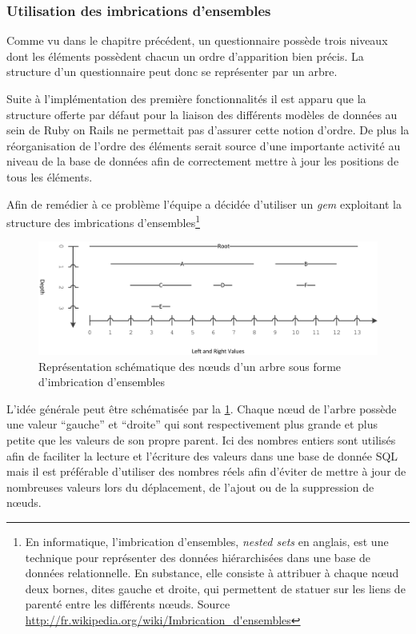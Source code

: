 \documentclass[12pt,a4paper]{book}
\begin{document}
\subsubsection{Utilisation des imbrications d'ensembles}
\label{sec.aws}

Comme vu dans le chapitre précédent, un questionnaire possède trois niveaux dont les éléments possèdent chacun un ordre d'apparition bien précis. La structure d'un questionnaire peut donc se représenter par un arbre.

Suite à l'implémentation des première fonctionnalités il est apparu que la structure offerte par défaut pour la liaison des différents modèles de données au sein de Ruby on Rails ne permettait pas d'assurer cette notion d'ordre. De plus la réorganisation de l'ordre des éléments serait source d'une importante activité au niveau de la base de données afin de correctement mettre à jour les positions de tous les éléments.

Afin de remédier à ce problème l'équipe a décidée d'utiliser un \textit{gem} exploitant la structure des imbrications d'ensembles\footnote{En informatique, l'imbrication d'ensembles, \textit{nested sets} en anglais, est une technique pour représenter des données hiérarchisées dans une base de données relationnelle. En substance, elle consiste à attribuer à chaque nœud deux bornes, dites gauche et droite, qui permettent de statuer sur les liens de parenté entre les différents nœuds. Source \url{http://fr.wikipedia.org/wiki/Imbrication_d'ensembles}}

\begin{figure}[htp]
\centering
\includegraphics[scale=.12]{img/nested1.png}
\caption{Représentation schématique des nœuds d'un arbre sous forme d'imbrication d'ensembles}
\label{img:nested1}
\end{figure}

L'idée générale peut être schématisée par la \cref{img:nested1}. Chaque nœud de l'arbre possède une valeur ``gauche'' et ``droite'' qui sont respectivement plus grande et plus petite que les valeurs de son propre parent. Ici des nombres entiers sont utilisés afin de faciliter la lecture et l'écriture des valeurs dans une base de donnée SQL mais il est préférable d'utiliser des nombres réels afin d'éviter de mettre à jour de nombreuses valeurs lors du déplacement, de l'ajout ou de la suppression de nœuds.
\end{document}
